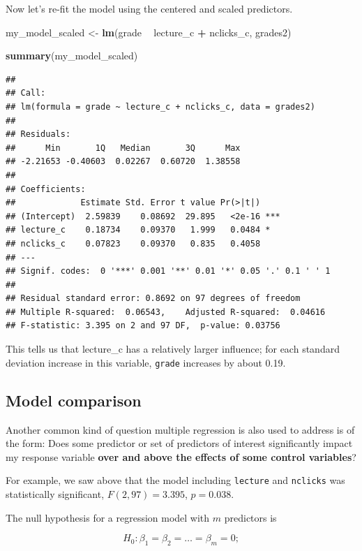 \documentclass[]{book}
\newenvironment{Shaded}{\begin{snugshade}}{\end{snugshade}}
\newcommand{\KeywordTok}[1]{\textcolor[rgb]{0.13,0.29,0.53}{\textbf{#1}}}
\newcommand{\NormalTok}[1]{#1}
\newcommand{\OperatorTok}[1]{\textcolor[rgb]{0.81,0.36,0.00}{\textbf{#1}}}
\newcommand{\StringTok}[1]{\textcolor[rgb]{0.31,0.60,0.02}{#1}}
\begin{document}
Now let's re-fit the model using the centered and scaled predictors.

\begin{Shaded}
\begin{Highlighting}[]
\NormalTok{my_model_scaled <-}\StringTok{ }\KeywordTok{lm}\NormalTok{(grade }\OperatorTok{~}\StringTok{ }\NormalTok{lecture_c }\OperatorTok{+}\StringTok{ }\NormalTok{nclicks_c, grades2)}

\KeywordTok{summary}\NormalTok{(my_model_scaled)}
\end{Highlighting}
\end{Shaded}

\begin{verbatim}
## 
## Call:
## lm(formula = grade ~ lecture_c + nclicks_c, data = grades2)
## 
## Residuals:
##      Min       1Q   Median       3Q      Max 
## -2.21653 -0.40603  0.02267  0.60720  1.38558 
## 
## Coefficients:
##             Estimate Std. Error t value Pr(>|t|)    
## (Intercept)  2.59839    0.08692  29.895   <2e-16 ***
## lecture_c    0.18734    0.09370   1.999   0.0484 *  
## nclicks_c    0.07823    0.09370   0.835   0.4058    
## ---
## Signif. codes:  0 '***' 0.001 '**' 0.01 '*' 0.05 '.' 0.1 ' ' 1
## 
## Residual standard error: 0.8692 on 97 degrees of freedom
## Multiple R-squared:  0.06543,	Adjusted R-squared:  0.04616 
## F-statistic: 3.395 on 2 and 97 DF,  p-value: 0.03756
\end{verbatim}

This tells us that lecture\_c has a relatively larger influence; for each standard deviation increase in this variable, \texttt{grade} increases by about 0.19.

\hypertarget{model-comparison}{%
\subsection{Model comparison}\label{model-comparison}}

Another common kind of question multiple regression is also used to address is of the form: Does some predictor or set of predictors of interest significantly impact my response variable \textbf{over and above the effects of some control variables}?

For example, we saw above that the model including \texttt{lecture} and \texttt{nclicks} was statistically significant,
\(F(2, 97) = 3.395\),
\(p = 0.038\).

The null hypothesis for a regression model with \(m\) predictors is

\[H_0: \beta_1 = \beta_2 = \ldots = \beta_m = 0;\]
\end{document}
